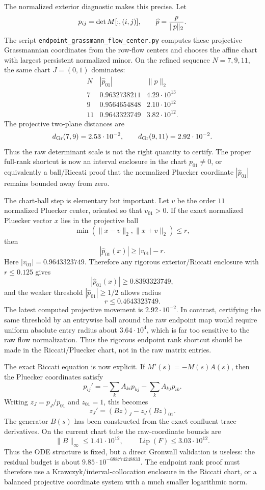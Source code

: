 \documentclass[11pt]{article}
\begin{document}
The normalized exterior diagnostic makes this precise.  Let
\[
  p_{ij}=\det M[:,(i,j)],\qquad \widehat p={p\over \|p\|_2}.
\]
The script \texttt{endpoint\_grassmann\_flow\_center.py} computes these projective
Grassmannian coordinates from the row-flow centers and chooses the affine
chart with largest persistent normalized minor.  On the refined sequence
\(N=7,9,11\), the same chart \(J=(0,1)\) dominates:
\[
\begin{array}{c|c|c}
N & |\widehat p_{01}| & \|p\|_2\\
\hline
7 & 0.9632738211 & 4.29\cdot10^{13}\\
9 & 0.9564654848 & 2.10\cdot10^{12}\\
11& 0.9643323749 & 3.82\cdot10^{12}.
\end{array}
\]
The projective two-plane distances are
\[
  d_{\rm Gr}(7,9)=2.53\cdot10^{-2},\qquad
  d_{\rm Gr}(9,11)=2.92\cdot10^{-2}.
\]
Thus the raw determinant scale is not the right quantity to certify.  The
proper full-rank shortcut is now an interval enclosure in the chart
\(p_{01}\ne0\), or equivalently a ball/Riccati proof that the normalized
Pluecker coordinate \(|\widehat p_{01}|\) remains bounded away from zero.

The chart-ball step is elementary but important.  Let \(v\) be the order
\(11\) normalized Pluecker center, oriented so that \(v_{01}>0\).  If the
exact normalized Pluecker vector \(x\) lies in the projective ball
\[
  \min(\|x-v\|_2,\|x+v\|_2)\le r,
\]
then
\[
  |\widehat p_{01}(x)|\ge |v_{01}|-r.
\]
Here \(|v_{01}|=0.9643323749\).  Therefore any rigorous exterior/Riccati
enclosure with \(r\le0.125\) gives
\[
  |\widehat p_{01}(x)|\ge0.8393323749,
\]
and the weaker threshold \(|\widehat p_{01}|\ge1/2\) allows radius
\[
  r\le0.4643323749.
\]
The latest computed projective movement is \(2.92\cdot10^{-2}\).  In contrast,
certifying the same threshold by an entrywise ball around the raw endpoint map
would require uniform absolute entry radius about \(3.64\cdot10^4\), which is
far too sensitive to the raw flow normalization.  Thus the rigorous endpoint
rank shortcut should be made in the Riccati/Pluecker chart, not in the raw
matrix entries.

The exact Riccati equation is now explicit.  If \(M'(s)=-M(s)A(s)\), then the
Pluecker coordinates satisfy
\[
  p_{ij}'=-\sum_k A_{ki}p_{kj}-\sum_k A_{kj}p_{ik}.
\]
Writing \(z_J=p_J/p_{01}\) and \(z_{01}=1\), this becomes
\[
  z_J'=(Bz)_J-z_J(Bz)_{01}.
\]
The generator \(B(s)\) has been constructed from the exact confluent trace
derivatives.  On the current chart tube the raw-coordinate bounds are
\[
  \|B\|_\infty\le1.41\cdot10^{12},\qquad
  \operatorname{Lip}(F)\le3.03\cdot10^{12}.
\]
Thus the ODE structure is fixed, but a direct Gronwall validation is useless:
the residual budget is about \(9.85\cdot10^{-688774248833}\).  The endpoint
rank proof must therefore use a Krawczyk/interval-collocation enclosure in
the Riccati chart, or a balanced projective coordinate system with a much
smaller logarithmic norm.
\end{document}

